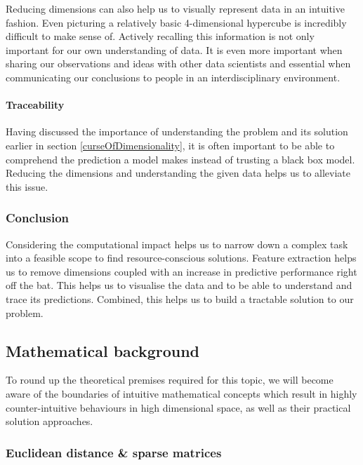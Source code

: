 Reducing dimensions can also help us to visually represent data in an intuitive fashion.
Even picturing a relatively basic 4-dimensional hypercube is incredibly difficult to make sense of.
Actively recalling this information is not only important for our own understanding of data. It is even more important when sharing our observations and ideas with other data scientists and essential when communicating our conclusions to people in an interdisciplinary environment. \cite{PythonMachineLearningCh5}

\paragraph{Traceability}

Having discussed the importance of understanding the problem and its solution earlier in section \ref{curseOfDimensionality}, it is often important to be able to comprehend the prediction a model makes instead of trusting a black box model. 
Reducing the dimensions and understanding the given data helps us to alleviate this issue.

\subsubsection{Conclusion}

Considering the computational impact helps us to narrow down a complex task into a feasible scope to find resource-conscious solutions.
Feature extraction helps us to remove dimensions coupled with an increase in predictive performance right off the bat.
This helps us to visualise the data and to be able to understand and trace its predictions.
Combined, this helps us to build a tractable solution to our problem.

\clearpage


\subsection{Mathematical background}

To round up the theoretical premises required for this topic, we will become aware of the boundaries of intuitive mathematical concepts which result in highly counter-intuitive behaviours in high dimensional space, as well as their practical solution approaches.

\subsubsection{Euclidean distance \& sparse matrices}

